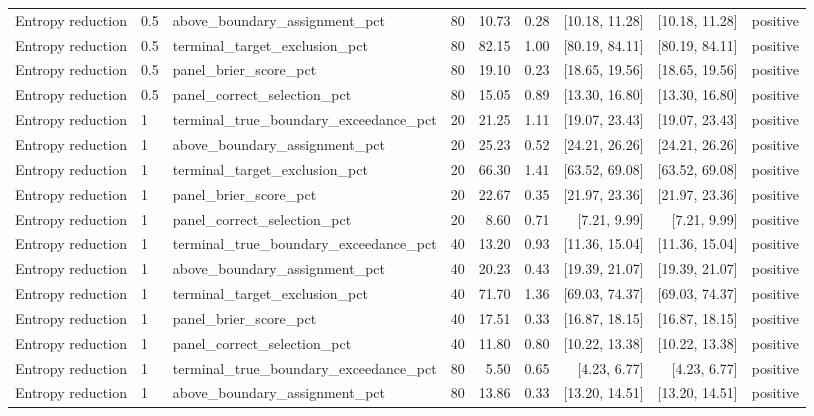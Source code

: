 \begin{longtable}{lllrrrrrl}
Entropy reduction & 0.5 & above\_boundary\_assignment\_pct & 80 & 10.73 & 0.28 & [10.18, 11.28] & [10.18, 11.28] & positive \\
Entropy reduction & 0.5 & terminal\_target\_exclusion\_pct & 80 & 82.15 & 1.00 & [80.19, 84.11] & [80.19, 84.11] & positive \\
Entropy reduction & 0.5 & panel\_brier\_score\_pct & 80 & 19.10 & 0.23 & [18.65, 19.56] & [18.65, 19.56] & positive \\
Entropy reduction & 0.5 & panel\_correct\_selection\_pct & 80 & 15.05 & 0.89 & [13.30, 16.80] & [13.30, 16.80] & positive \\
Entropy reduction & 1 & terminal\_true\_boundary\_exceedance\_pct & 20 & 21.25 & 1.11 & [19.07, 23.43] & [19.07, 23.43] & positive \\
Entropy reduction & 1 & above\_boundary\_assignment\_pct & 20 & 25.23 & 0.52 & [24.21, 26.26] & [24.21, 26.26] & positive \\
Entropy reduction & 1 & terminal\_target\_exclusion\_pct & 20 & 66.30 & 1.41 & [63.52, 69.08] & [63.52, 69.08] & positive \\
Entropy reduction & 1 & panel\_brier\_score\_pct & 20 & 22.67 & 0.35 & [21.97, 23.36] & [21.97, 23.36] & positive \\
Entropy reduction & 1 & panel\_correct\_selection\_pct & 20 & 8.60 & 0.71 & [7.21, 9.99] & [7.21, 9.99] & positive \\
Entropy reduction & 1 & terminal\_true\_boundary\_exceedance\_pct & 40 & 13.20 & 0.93 & [11.36, 15.04] & [11.36, 15.04] & positive \\
Entropy reduction & 1 & above\_boundary\_assignment\_pct & 40 & 20.23 & 0.43 & [19.39, 21.07] & [19.39, 21.07] & positive \\
Entropy reduction & 1 & terminal\_target\_exclusion\_pct & 40 & 71.70 & 1.36 & [69.03, 74.37] & [69.03, 74.37] & positive \\
Entropy reduction & 1 & panel\_brier\_score\_pct & 40 & 17.51 & 0.33 & [16.87, 18.15] & [16.87, 18.15] & positive \\
Entropy reduction & 1 & panel\_correct\_selection\_pct & 40 & 11.80 & 0.80 & [10.22, 13.38] & [10.22, 13.38] & positive \\
Entropy reduction & 1 & terminal\_true\_boundary\_exceedance\_pct & 80 & 5.50 & 0.65 & [4.23, 6.77] & [4.23, 6.77] & positive \\
Entropy reduction & 1 & above\_boundary\_assignment\_pct & 80 & 13.86 & 0.33 & [13.20, 14.51] & [13.20, 14.51] & positive \\

\end{longtable}
